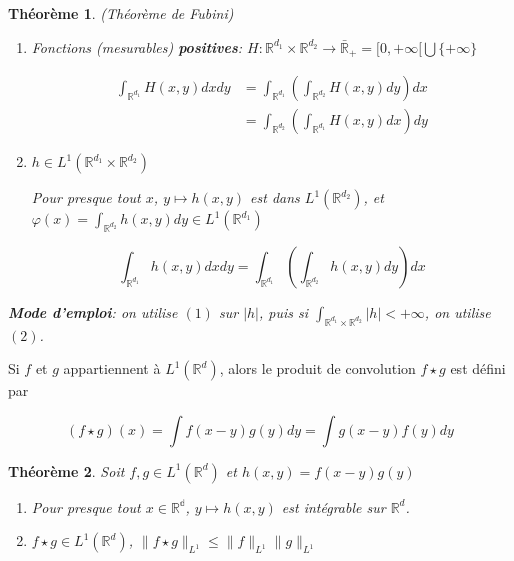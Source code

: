 \documentclass[10pt,a4paper,oneside]{article}
\newtheorem{theoreme}{Théorème}
\newenvironment{definition}[1][Definition]{\begin{trivlist}
\item[\hskip \labelsep {\bfseries #1}]}{\end{trivlist}}
\begin{document}
\begin{itemize}
\item
\begin{theoreme}
(Théorème de Fubini)

\begin{enumerate}
\item
Fonctions (mesurables) \textbf{positives}: $H: \mathbb{R}^{d_1} \times \mathbb{R}^{d_2} \to \bar{\mathbb{R}}_+ = [0,+\infty[ \bigcup \{+\infty\}$

\begin{align*}
\int_{\mathbb{R}^{d_1}} H(x,y) dx dy &= \int_{\mathbb{R}^{d_1}} (\int_{\mathbb{R}^{d_2}} H(x,y) dy) dx \\
&= \int_{\mathbb{R}^{d_2}} (\int_{\mathbb{R}^{d_1}} H(x,y) dx) dy
\end{align*}

\item
$h \in L^1(\mathbb{R}^{d_1} \times \mathbb{R}^{d_2})$

Pour presque tout $x$, $y \mapsto h(x,y)$ est dans $L^1(\mathbb{R}^{d_2})$, et $\varphi(x) = \int_{\mathbb{R}^{d_2}} h(x,y) dy \in L^1(\mathbb{R}^{d_1})$

\[ \int_{\mathbb{R}^{d_1}} h(x,y) dx dy = \int_{\mathbb{R}^{d_1}} (\int_{\mathbb{R}^{d_2}} h(x,y) dy) dx \]

\end{enumerate}

\textbf{Mode d'emploi}: on utilise $(1)$ sur $|h|$, puis si $\int_{\mathbb{R}^{d_1} \times \mathbb{R}^{d_2}} |h| < +\infty$, on utilise $(2)$.
\end{theoreme}

\item
\begin{definition}
Si $f$ et $g$ appartiennent à $L^1(\mathbb{R}^d)$, alors le produit de convolution $f \star g$ est défini par

\[ (f \star g)(x) = \int f(x - y)g(y) dy = \int g(x - y) f(y) dy \]
\end{definition}

\item
\begin{theoreme}
Soit $f,g \in L^1(\mathbb{R}^d)$ et $h(x,y)= f(x - y)g(y)$

\begin{enumerate}
\item
Pour presque tout $x \in \mathbb{R^d}$, $y \mapsto h(x,y)$ est intégrable sur $\mathbb{R}^d$.

\item
$f \star g \in L^1(\mathbb{R}^d)$, $\| f \star g \|_{L^1} \leq \| f \|_{L^1} \| g \|_{L^1}$
\end{enumerate}
\end{theoreme}


\end{itemize}
\end{document}
